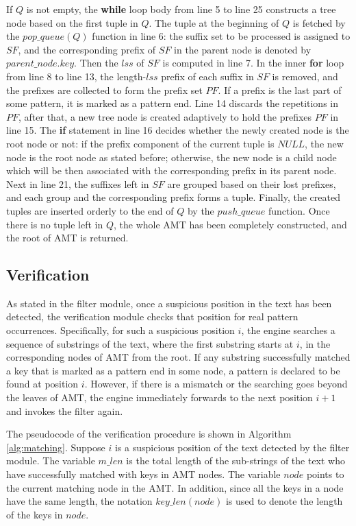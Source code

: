 \documentclass{article}
\begin{document}
If $Q$ is not empty, the \textbf{while} loop body from line 5 to line
25 constructs a tree node based on the first tuple in $Q$. The tuple
at the beginning of $Q$ is fetched by the $pop\_queue(Q)$ function in
line 6: the suffix set to be processed is assigned to $SF$, and the
corresponding prefix of $SF$ in the parent node is denoted by
$parent\_node.key$. Then the $lss$ of $SF$ is computed in line 7. In
the inner \textbf{for} loop from line 8 to line 13, the length-$lss$
prefix of each suffix in $SF$ is removed, and the prefixes are
collected to form the prefix set $PF$. If a prefix is the last part of
some pattern, it is marked as a pattern end. Line 14 discards the
repetitions in $PF$, after that, a new tree node is created adaptively
to hold the prefixes $PF$ in line 15. The \textbf{if} statement in
line 16 decides whether the newly created node is the root node or
not: if the prefix component of the current tuple is $NULL$, the new
node is the root node as stated before; otherwise, the new node is a
child node which will be then associated with the corresponding prefix
in its parent node. Next in line 21, the suffixes left in $SF$ are
grouped based on their lost prefixes, and each group and the
corresponding prefix forms a tuple. Finally, the created tuples are
inserted orderly to the end of $Q$ by the $push\_queue$ function. Once
there is no tuple left in $Q$, the whole AMT has been completely
constructed, and the root of AMT is returned.

\subsection{Verification}
\label{subsec:matching}

As stated in the filter module, once a suspicious position in the text
has been detected, the verification module checks that position for
real pattern occurrences. Specifically, for such a suspicious position
$i$, the engine searches a sequence of substrings of the text, where
the first substring starts at $i$, in the corresponding nodes of AMT
from the root. If any substring successfully matched a key that is
marked as a pattern end in some node, a pattern is declared to be
found at position $i$. However, if there is a mismatch or the
searching goes beyond the leaves of AMT, the engine immediately
forwards to the next position $i+1$ and invokes the filter again.

The pseudocode of the verification procedure is shown in Algorithm
\ref{alg:matching}. Suppose $i$ is a suspicious position of the text
detected by the filter module. The variable $m\_len$ is the total
length of the sub-strings of the text who have successfully matched
with keys in AMT nodes. The variable $node$ points to the current
matching node in the AMT. In addition, since all the keys in a node
have the same length, the notation $key\_len(node)$ is used to denote
the length of the keys in $node$.
\end{document}
